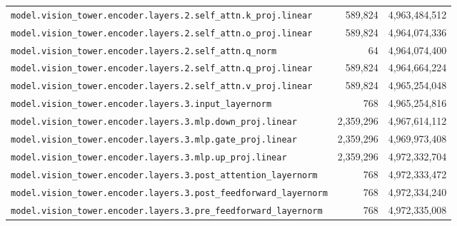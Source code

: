 \documentclass[10pt,a4paper]{article}
\theoremstyle{definition}
\begin{document}
\begin{appendices}
\begin{longtable}{p{9.5cm}rr}
\texttt{model.\allowbreak{}vision\_tower.\allowbreak{}encoder.\allowbreak{}layers.\allowbreak{}2.\allowbreak{}self\_attn.\allowbreak{}k\_proj.\allowbreak{}linear} & 589,824 & 4,963,484,512 \\
\texttt{model.\allowbreak{}vision\_tower.\allowbreak{}encoder.\allowbreak{}layers.\allowbreak{}2.\allowbreak{}self\_attn.\allowbreak{}o\_proj.\allowbreak{}linear} & 589,824 & 4,964,074,336 \\
\texttt{model.\allowbreak{}vision\_tower.\allowbreak{}encoder.\allowbreak{}layers.\allowbreak{}2.\allowbreak{}self\_attn.\allowbreak{}q\_norm} & 64 & 4,964,074,400 \\
\texttt{model.\allowbreak{}vision\_tower.\allowbreak{}encoder.\allowbreak{}layers.\allowbreak{}2.\allowbreak{}self\_attn.\allowbreak{}q\_proj.\allowbreak{}linear} & 589,824 & 4,964,664,224 \\
\texttt{model.\allowbreak{}vision\_tower.\allowbreak{}encoder.\allowbreak{}layers.\allowbreak{}2.\allowbreak{}self\_attn.\allowbreak{}v\_proj.\allowbreak{}linear} & 589,824 & 4,965,254,048 \\
\texttt{model.\allowbreak{}vision\_tower.\allowbreak{}encoder.\allowbreak{}layers.\allowbreak{}3.\allowbreak{}input\_layernorm} & 768 & 4,965,254,816 \\
\texttt{model.\allowbreak{}vision\_tower.\allowbreak{}encoder.\allowbreak{}layers.\allowbreak{}3.\allowbreak{}mlp.\allowbreak{}down\_proj.\allowbreak{}linear} & 2,359,296 & 4,967,614,112 \\
\texttt{model.\allowbreak{}vision\_tower.\allowbreak{}encoder.\allowbreak{}layers.\allowbreak{}3.\allowbreak{}mlp.\allowbreak{}gate\_proj.\allowbreak{}linear} & 2,359,296 & 4,969,973,408 \\
\texttt{model.\allowbreak{}vision\_tower.\allowbreak{}encoder.\allowbreak{}layers.\allowbreak{}3.\allowbreak{}mlp.\allowbreak{}up\_proj.\allowbreak{}linear} & 2,359,296 & 4,972,332,704 \\
\texttt{model.\allowbreak{}vision\_tower.\allowbreak{}encoder.\allowbreak{}layers.\allowbreak{}3.\allowbreak{}post\_attention\_layernorm} & 768 & 4,972,333,472 \\
\texttt{model.\allowbreak{}vision\_tower.\allowbreak{}encoder.\allowbreak{}layers.\allowbreak{}3.\allowbreak{}post\_feedforward\_layernorm} & 768 & 4,972,334,240 \\
\texttt{model.\allowbreak{}vision\_tower.\allowbreak{}encoder.\allowbreak{}layers.\allowbreak{}3.\allowbreak{}pre\_feedforward\_layernorm} & 768 & 4,972,335,008 \\

\end{longtable}
\end{appendices}
\end{document}
